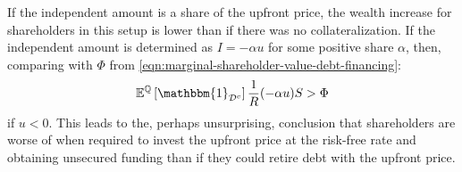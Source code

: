 \documentclass[main.tex]{subfiles}
\begin{document}
        If the independent amount is a share of the upfront price, 
        the wealth increase for shareholders in this setup is lower than
        if there was no collateralization. 
        If the independent amount is determined as $I=-\alpha u$ for some positive share $\alpha$, 
        then, comparing with $\Phi$ from \cref*{eqn:marginal-shareholder-value-debt-financing}:
        \begin{equation*}
            \mathbb{E}^{\mathbb{Q}}\left[
                \mathbbm{1}_{\mathcal{D}^{c}}
            \right] \discountfactor (-\alpha u) S
            >
            \Phi
        \end{equation*}
        if $u<0$.
        This leads to the, perhaps unsurprising, conclusion
        that shareholders are worse of when required to invest the upfront price at the risk-free rate
        and obtaining unsecured funding
        than if they could retire debt with the upfront price.
\end{document}

